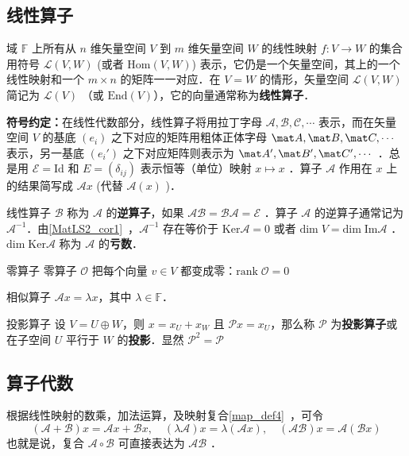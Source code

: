 
\subsection{线性算子}\label{LiOper_sub4}
域 $\mathbb{F}$ 上所有从 $n$ 维矢量空间 $V$ 到 $m$ 维矢量空间 $W$ 的线性映射 $f:V\rightarrow W$ 的集合用符号 $\mathcal{L}(V,W)$ (或者 $\mathrm{Hom}(V,W)$) 表示，它仍是一个矢量空间，其上的一个线性映射和一个 $m\times n$ 的矩阵一一对应．在 $V=W$ 的情形，矢量空间 $\mathcal{L}(V,W)$ 简记为 $\mathcal{L}(V)$ （或 $\mathrm{End}(V)$），它的向量通常称为\textbf{线性算子}．

\textbf{符号约定：}在线性代数部分，线性算子将用拉丁字母 $\mathcal{A,B,C,\cdots}$ 表示，而在矢量空间 $V$ 的基底 $( e_i)$ 之下对应的矩阵用粗体正体字母 $\mat A,\mat B,\mat C,\cdots$ 表示，另一基底 $( e_i')$ 之下对应矩阵则表示为 $\mat A',\mat B',\mat C',\cdots$ ．总是用 $\mathcal{E}=\mathrm{Id}$ 和 $E=(\delta_{ij})$ 表示恒等（单位）映射 $ x\mapsto  x$ ．算子 $\mathcal{A}$ 作用在 $ x$ 上的结果简写成 $\mathcal{A} x$ (代替 $\mathcal{A}( x)$ )．

线性算子 $\mathcal{B}$ 称为 $\mathcal{A}$ 的\textbf{逆算子}，如果 $\mathcal{AB}=\mathcal{BA}=\mathcal{E}$ ．算子 $\mathcal{A}$ 的逆算子通常记为 $\mathcal{A}^{-1}$．由\autoref{MatLS2_cor1}~，$\mathcal{A}^{-1}$ 存在等价于 $\mathrm{Ker}\mathcal{A}=0$ 或者 $\mathrm{dim}\;V=\mathrm{dim\;Im}\mathcal{A}$ ．$\mathrm{dim\;Ker}\mathcal{A}$ 称为 $\mathcal{A}$ 的\textbf{亏数}．
\begin{example}{零算子}\label{LiOper_ex1}
零算子 $\mathcal{O}$ 把每个向量 $ v\in V$ 都变成零：$\mathrm{rank}\; \mathcal{O}=0$
\end{example}
\begin{example}{相似算子}
$\mathcal{A} x=\lambda x$，其中 $\lambda\in\mathbb{F}$．
\end{example}
\begin{example}{投影算子}
设 $V=U\oplus W$，则 $ x= x_U+ x_W$ 且 $\mathcal{P} x= x_U$，那么称 $\mathcal{P}$ 为\textbf{投影算子}或在子空间 $U$ 平行于 $W$ 的\textbf{投影}．显然 $\mathcal{P}^2=\mathcal{P}$
\end{example}
\subsection{算子代数}\label{LiOper_sub3}
根据线性映射的数乘，加法运算，及映射复合\autoref{map_def4}~，可令
\begin{equation}\label{LiOper_eq1}
(\mathcal{A}+\mathcal{B}) x=\mathcal{A} x+\mathcal{B} x,\quad (\lambda\mathcal A) x=\lambda(\mathcal A x),\quad (\mathcal{AB}) x=\mathcal{A}(\mathcal{B} x)
\end{equation}
也就是说，复合 $\mathcal{A\circ B}$ 可直接表达为 $\mathcal{AB}$ ．

